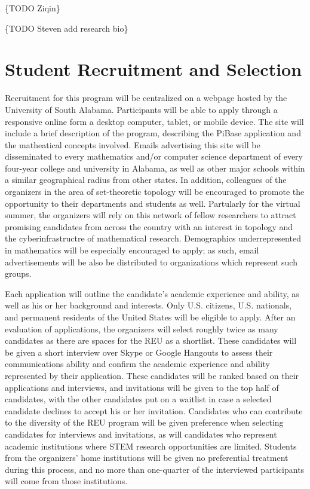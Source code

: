 \{TODO Ziqin\}

\{TODO Steven add research bio\}

\section{Student Recruitment and Selection}

Recruitment for this program will be centralized on a webpage hosted
by the University of South Alabama. Participants will be able to apply
through a responsive online form a desktop computer, tablet, or mobile device.
The site will include a brief description of the program, describing the
PiBase application and the matheatical concepts involved.
Emails advertising this site will be disseminated to every mathematics
and/or computer science department of every four-year college and
university in Alabama, as well as other major schools within a similar
geographical radius from other states.
In addition, colleagues of the organizers in the area of set-theoretic
topology will be encouraged to promote the opportunity to their departments
and students as well. Partularly for the virtual summer, the organizers
will rely on this
network of fellow researchers to attract promising candidates from across
the country with an interest in topology and the cyberinfrastructre of
mathematical research. Demographics underrepresented in mathematics
will be especially encouraged to apply; as such, email advertisements
will be also be distributed to organizations which represent such groups.

Each application will outline the candidate's academic
experience and ability, as well as his or her background and interests.
Only U.S. citizens, U.S. nationals, and
permanent residents of the United States will be eligible to apply.
After an evaluation of applications, the organizers will select roughly twice
as many candidates as there are spaces for the REU as a shortlist. These
candidates will be given a short interview over Skype or Google Hangouts
to assess their communications ability and confirm the academic experience
and ability represented by their application. These candidates will be
ranked based on their applications and interviews, and invitations will
be given to the top half of candidates, with the other candidates put
on a waitlist in case a selected candidate declines to accept his or her
invitation. Candidates who can contribute to the diversity of the
REU program will be given preference when selecting candidates for
interviews and invitations, as will candidates who represent academic
institutions where STEM research opportunities are limited.
Students from the organizers' home institutions
will be given no preferential treatment during this process, and no more
than one-quarter of the interviewed participants will come from those
institutions.

